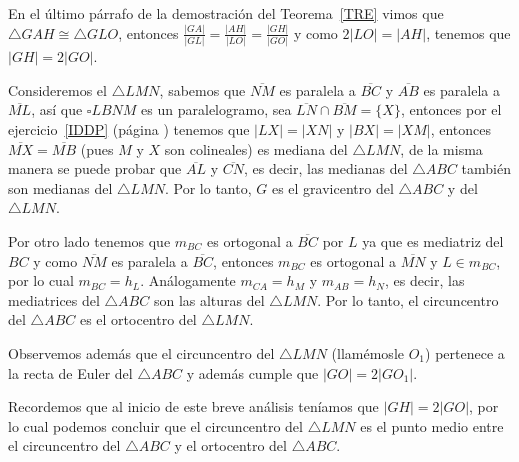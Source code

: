 En el último párrafo de la demostración del Teorema~\ref{TRE} vimos que $\triangle GAH\cong\triangle GLO$, entonces $\frac{|GA|}{|GL|}=\frac{|AH|}{|LO|}=\frac{|GH|}{|GO|}$ y como $2|LO|=|AH|$, tenemos que $|GH|=2|GO|$.

Consideremos el $\triangle LMN$, sabemos que $\overline{NM}$ es paralela a $\overline{BC}$ y $\overline{AB}$ es paralela a $\overline{ML}$, así que $\square LBNM$ es un paralelogramo, sea $\overline{LN}\cap\overline{BM}=\{X\}$, entonces por el ejercicio~\ref{IDDP} (página \pageref{IDDP}) tenemos que $|LX|=|XN|$ y $|BX|=|XM|$, entonces $\overline{MX}=\overline{MB}$ (pues $M$ y $X$ son colineales) es mediana del $\triangle LMN$, de la misma manera se puede probar que $\overline{AL}$ y $\overline{CN}$, es decir, las medianas del $\triangle ABC$ también son medianas del $\triangle LMN$. Por lo tanto, $G$ es el gravicentro del $\triangle ABC$ y del $\triangle LMN$.

Por otro lado tenemos que $m_{BC}$ es ortogonal a $\overline{BC}$ por $L$ ya que es mediatriz del $BC$ y como $\overline{NM}$ es paralela a $\overline{BC}$, entonces $m_{BC}$ es ortogonal a $\overline{MN}$ y $L\in m_{BC}$, por lo cual $m_{BC}=h_{L}$. Análogamente $m_{CA}=h_{M}$ y $m_{AB}=h_{N}$, es decir, las mediatrices del $\triangle ABC$ son las alturas del $\triangle LMN$. Por lo tanto, el circuncentro del $\triangle ABC$ es el ortocentro del $\triangle LMN$. 

Observemos además que el circuncentro del $\triangle LMN$ (llamémosle $O_{1}$) pertenece a la recta de Euler del $\triangle ABC$ y además cumple que $|GO|=2|GO_{1}|$.

Recordemos que al inicio de este breve análisis teníamos que $|GH|=2|GO|$, por lo cual podemos concluir que el circuncentro del $\triangle LMN$ es el punto medio entre el circuncentro del $\triangle ABC$ y el ortocentro del $\triangle ABC$. 
